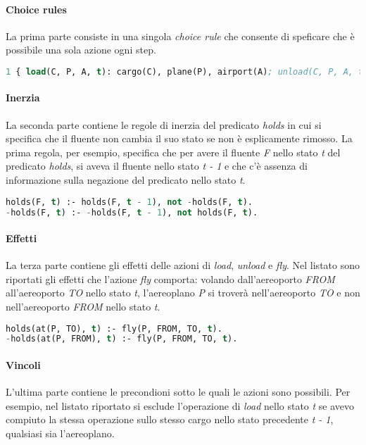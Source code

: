 \documentclass[12pt]{report}
\begin{document}
\paragraph*{Choice rules}
La prima parte consiste in una singola \emph{choice rule} che consente di speficare che è possibile una sola azione ogni step.

\begin{lstlisting}[language=lisp]
1 { load(C, P, A, t): cargo(C), plane(P), airport(A); unload(C, P, A, t): cargo(C), plane(P), airport(A); fly(P, FROM, TO, t): plane(P), airport(FROM), airport(TO), FROM != TO} 1.
\end{lstlisting}

\paragraph*{Inerzia}
La seconda parte contiene le regole di inerzia del predicato \emph{holds} in cui si specifica che il fluente non cambia il suo stato se non è esplicamente rimosso.
La prima regola, per esempio, specifica che per avere il fluente \emph{F} nello stato \emph{t} del predicato \emph{holds}, si aveva il fluente nello stato \emph{t - 1} e che c'è assenza di informazione sulla negazione del predicato nello stato \emph{t}.

\begin{lstlisting}[language=lisp]
holds(F, t) :- holds(F, t - 1), not -holds(F, t).
-holds(F, t) :- -holds(F, t - 1), not holds(F, t).
\end{lstlisting}

\paragraph*{Effetti}
La terza parte contiene gli effetti delle azioni di \emph{load}, \emph{unload} e \emph{fly}.
Nel listato sono riportati gli effetti che l'azione \emph{fly} comporta: volando dall'aereoporto \emph{FROM} all'aereoporto \emph{TO} nello stato \emph{t}, l'aereoplano \emph{P} si troverà nell'aereoporto \emph{TO} e non nell'aereoporto \emph{FROM} nello stato \emph{t}.

\begin{lstlisting}[language=lisp]
holds(at(P, TO), t) :- fly(P, FROM, TO, t).
-holds(at(P, FROM), t) :- fly(P, FROM, TO, t).
\end{lstlisting}

\paragraph*{Vincoli}
L'ultima parte contiene le precondioni sotto le quali le azioni sono possibili.
Per esempio, nel listato riportato si esclude l'operazione di \emph{load} nello stato \emph{t} se avevo compiuto la stessa operazione sullo stesso cargo nello stato precedente \emph{t - 1}, qualsiasi sia l'aereoplano.
\end{document}
